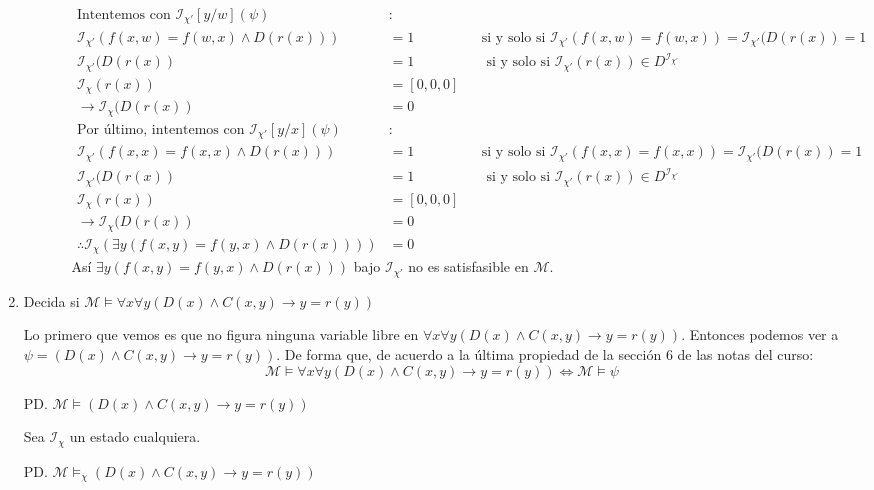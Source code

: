\documentclass[8pt, letterpaper]{article}
\begin{document}
\begin{enumerate}
\begin{enumerate}
\begin{itemize}
\begin{align*}
        \text{Intentemos con }\mathcal{I}_{\chi'}[y/w](\psi)&:\\
        \mathcal{I}_{\chi'}(f(x,w) = f(w,x)\land D(r(x))) &= 1 & &\text{si y solo si } \mathcal{I}_{\chi'}(f(x,w) = f(w,x)) = \mathcal{I}_{\chi'}(D(r(x)) = 1\\
        \mathcal{I}_{\chi'}(D(r(x)) &= 1 & &\text{ si y solo si } \mathcal{I}_{\chi'}(r(x))\in D^{\mathcal{I}_{\chi'}}\\
        \mathcal{I}_\chi(r(x)) &= [0,0,0] \\
        \rightarrow \mathcal{I}_\chi(D(r(x)) &= 0\\
        \text{Por último, intentemos con }\mathcal{I}_{\chi'}[y/x](\psi)&:\\
        \mathcal{I}_{\chi'}(f(x,x) = f(x,x)\land D(r(x))) &= 1 & &\text{si y solo si } \mathcal{I}_{\chi'}(f(x,x) = f(x,x)) = \mathcal{I}_{\chi'}(D(r(x)) = 1\\
        \mathcal{I}_{\chi'}(D(r(x)) &= 1 & &\text{ si y solo si } \mathcal{I}_{\chi'}(r(x))\in D^{\mathcal{I}_{\chi'}}\\
        \mathcal{I}_\chi(r(x)) &= [0,0,0] \\
        \rightarrow \mathcal{I}_\chi(D(r(x)) &= 0\\
        \therefore \mathcal{I}_\chi(\exists y(f(x,y) = f(y,x)\land D(r(x)))) &= 0
      \end{align*}
      Así $\exists y(f(x,y) = f(y,x)\land D(r(x)))$ bajo $\mathcal{I}_{\chi'}$ no es satisfasible en $\mathcal{M}$.
    \end{itemize}
  \end{enumerate}
  \newpage
\item Decida si
  $\mathcal{M} \models \forall x\forall y(D(x)\land C(x,y)\rightarrow
  y = r(y))$
  
  Lo primero que vemos es que no figura ninguna variable libre en $ \forall x\forall y(D(x)\land C(x,y)\rightarrow
  y = r(y))$. Entonces podemos ver a $\psi = (D(x)\land C(x,y)\rightarrow y = r(y))$. De forma que, de acuerdo a la última
  propiedad de la sección 6 de las notas del curso:
  $$\mathcal{M} \models \forall x\forall y(D(x)\land C(x,y)\rightarrow y = r(y)) \iff \mathcal{M} \models \psi$$

  PD. $\mathcal{M} \models (D(x)\land C(x,y)\rightarrow y = r(y))$

  \hfill\break
  Sea $\mathcal{I}_\chi$ un estado cualquiera.

  PD. $\mathcal{M} \models_\chi (D(x)\land C(x,y)\rightarrow y = r(y))$
  

\end{enumerate}
\end{document}
